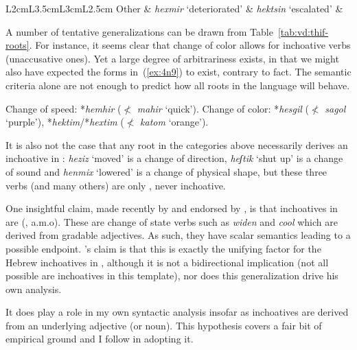 \begin{exe}
\begin{xlist}
\begin{xlist}
\begin{exe}
\begin{exe}
\begin{xlist}
\begin{exe}
\begin{xlist}
\begin{exe}
\begin{xlist}
\begin{xlist}
\begin{table}
\begin{tabularx}{\textwidth}{L{2cm}L{3.5cm}L{3cm}L{2.5cm}}
	Other & \emph{hexmir} `deteriorated' & \emph{hek{ts}in} `escalated' &  \\
\lspbottomrule
 	\end{tabularx}
\caption{Lexical semantic classes for alternating verbs in {\thif} and transitive foils}
\label{tab:vd:thif-roots}
\end{table}



A number of tentative generalizations can be drawn from Table~\ref{tab:vd:thif-roots}. For instance, it seems clear that change of color allows for inchoative verbs (unaccusative ones). Yet a large degree of arbitrariness exists, in that we might also have expected the forms in~(\ref{ex:4n9}) to exist, contrary to fact. The semantic criteria alone are not enough to predict how all roots in the language will behave.

 \begin{exe}
 \ex  \label{ex:4n9}
 \begin{xlist} 
 	\ex  Change of speed: 
		*\emph{hemhir} ($\nless$ \emph{mahir} `quick').
 	\ex  Change of color: 
		*\emph{hesgil} ($\nless$ \emph{sagol} `purple'), *\emph{hektim}/*\emph{hextim} ($\nless$ \emph{katom} `orange').
 \z
\z 

It is also not the case that any root in the categories above necessarily derives an inchoative in {\thif}: \emph{heziz} `moved' is a change of direction, \emph{heʃtik} `shut up' is a change of sound and \emph{henmix} `lowered' is a change of physical shape, but these three verbs (and many others) are only , never inchoative.

One insightful claim, made recently by \cite{lev16} and endorsed by \cite{kastner19tlr}, is that inchoatives in {\thif} are \textsc{} (\citealt{dowty91,hayetal99,rotsteinwinter04,kennedylevin08,bobaljik12,mcnally17}, a.m.o). These are change of state verbs such as \emph{widen} and \emph{cool} which are derived from gradable adjectives. As such, they have scalar semantics leading to a possible endpoint. \citeauthor{lev16}'s claim is that this is exactly the unifying factor for the Hebrew inchoatives in {\thif}, although it is not a bidirectional implication (not all possible  are inchoatives in this template), nor does this generalization drive his own analysis.

It does play a role in my own syntactic analysis insofar as inchoatives are derived from an underlying adjective (or noun). This hypothesis covers a fair bit of empirical ground and I follow \cite{lev16} in adopting it. 


\end{xlist}
\end{exe}
\end{xlist}
\end{xlist}
\end{exe}
\end{xlist}
\end{exe}
\end{xlist}
\end{exe}
\end{exe}
\end{xlist}
\end{xlist}
\end{exe}
